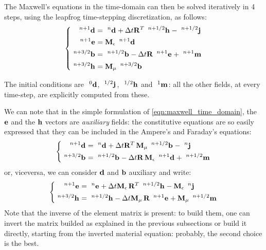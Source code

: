 The Maxwell's equations in the time-domain can then be solved
iteratively in 4 steps, using the leapfrog time-stepping
discretization, as follows:
\begin{equation} \label{eqn:maxwell_time_domain} \left\{ \begin{aligned} 
  \Disc{\Array{d}}{}{n+1} & = \Disc{\Array{d}}{}{n} + \deltat
  \Prod{\Transpose{\Matrix{R}}}{\Disc{\Array{h}}{}{n+1/2}} - \Disc{\Array{j}}{}{n+1/2} \\
  \Disc{\Array{e}}{}{n+1} & = \Prod{\Matrix{M}_\epsilon}{\Disc{\Array{d}}{}{n+1}} \\
  \Disc{\Array{b}}{}{n+3/2} & = \Disc{\Array{b}}{}{n+1/2} - \deltat
  \Prod{\Matrix{R}}{\Disc{\Array{e}}{}{n+1}} + \Disc{\Array{m}}{}{n+1} \\
  \Disc{\Array{h}}{}{n+3/2} & = \Prod{\Matrix{M}_\mu}{\Disc{\Array{b}}{}{n+3/2}}
\end{aligned} \right. \end{equation}

The initial conditions are $\Disc{\Array{d}}{}{0}$,
$\Disc{\Array{j}}{}{1/2}$, $\Disc{\Array{h}}{}{1/2}$ and
$\Disc{\Array{m}}{}{1}$: all the other fields, at every time-step,
are explicitly computed from these.

We can note that in the simple formulation of
\eqref{eqn:maxwell_time_domain}, the $\Array{e}$ and the $\Array{h}$
vectors are \emph{auxiliary} fields: the constitutive equations are so
easily expressed that they can be included in the Ampere's and
Faraday's equations:
\begin{equation*} \left\{ \begin{aligned}
  \Disc{\Array{d}}{}{n+1} & = \Disc{\Array{d}}{}{n} + \deltat
  \Prod{\Transpose{\Matrix{R}}}{\Prod{\Matrix{M}_\mu}{\Disc{\Array{b}}{}{n+1/2}}}
  - \Disc{\Array{j}}{}{n} \\
  \Disc{\Array{b}}{}{n+3/2} & = \Disc{\Array{b}}{}{n+1/2} - \deltat
  \Prod{\Matrix{R}}{\Prod{\Matrix{M}_\epsilon}{\Disc{\Array{d}}{}{n+1}}}
  + \Disc{\Array{m}}{}{n+1/2}
\end{aligned} \right. \end{equation*}
or, viceversa, we can consider $\Array{d}$ and $\Array{b}$ auxiliary
and write:
\begin{equation} \label{eqn:maxwell_time_domain_reduced} \left\{ \begin{aligned}
  \Disc{\Array{e}}{}{n+1} & = \Disc{\Array{e}}{}{n} + \deltat
  \Prod{\Matrix{M}_\epsilon}{\Prod{\Transpose{\Matrix{R}}}{\Disc{\Array{h}}{}{n+1/2}}}
  - \Prod{\Matrix{M}_\epsilon}{\Disc{\Array{j}}{}{n}} \\
  \Disc{\Array{h}}{}{n+3/2} & = \Disc{\Array{h}}{}{n+1/2} - \deltat
  \Prod{\Matrix{M}_\mu}{\Prod{\Matrix{R}}{\Disc{\Array{e}}{}{n+1}}}
  + \Prod{\Matrix{M}_\mu}{\Disc{\Array{m}}{}{n+1/2}}
\end{aligned} \right. \end{equation}
Note that the inverse of the element matrix is present: to build them,
one can invert the matrix builded as explained in the previous
subsections or build it directly, starting from the inverted material
equation: probably, the second choice is the best.

